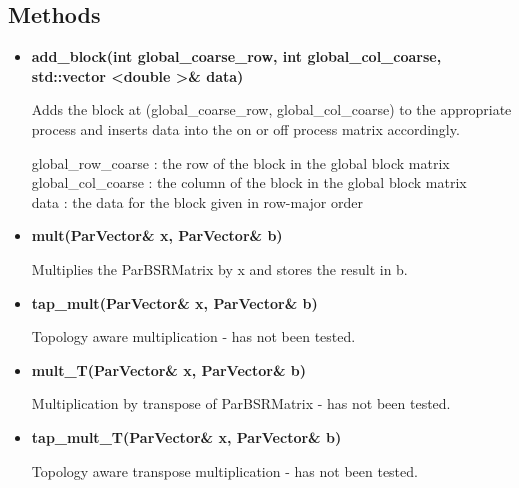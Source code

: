 \documentclass{article}
\begin{document}
\subsection*{Methods}
\begin{itemize}
    \item \textbf{add\_block(int global\_coarse\_row, int global\_col\_coarse,
                    std::vector \textless double \textgreater \& data)}
                    
        Adds the block at (global\_coarse\_row, global\_col\_coarse) to the appropriate
        process and inserts data into the on or off process matrix accordingly. 
        
        global\_row\_coarse : the row of the block in the global block matrix \\
        global\_col\_coarse : the column of the block in the global block matrix \\
        data : the data for the block given in row-major order
                    
    \item \textbf{mult(ParVector\& x, ParVector\& b)}
    
        Multiplies the ParBSRMatrix by x and stores the result in b.
    
    \item \textbf{tap\_mult(ParVector\& x, ParVector\& b)}
    
        Topology aware multiplication - has not been tested.
    
    \item \textbf{mult\_T(ParVector\& x, ParVector\& b)}
    
        Multiplication by transpose of ParBSRMatrix - has not been tested.
    
    \item \textbf{tap\_mult\_T(ParVector\& x, ParVector\& b)}
    
        Topology aware transpose multiplication - has not been tested.
\end{itemize}
\end{document}
